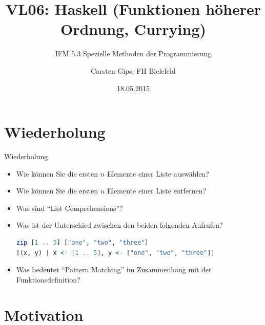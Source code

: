 \documentclass[svgnames,smaller,ngerman]{beamer}
\title{VL06: Haskell (Funktionen höherer Ordnung, Currying)}
\subtitle{IFM 5.3 Spezielle Methoden der Programmierung}
\author{Carsten Gips, FH Bielefeld}
\date{18.05.2015}
\begin{document}
\frame{
    \titlepage
}



\section{Wiederholung}

\begin{frame}[fragile]{Wiederholung}
    \begin{itemize}
        \item Wie können Sie die ersten $n$ Elemente einer Liste auswählen?
        \item Wie können Sie die ersten $n$ Elemente einer Liste entfernen?
        \item Was sind \enquote{List Comprehensions}?
        \item Was ist der Unterschied zwischen den beiden folgenden Aufrufen?
        \begin{small}
        \begin{lstlisting}[language=Haskell]
zip [1 .. 5] ["one", "two", "three"]
[(x, y) | x <- [1 .. 5], y <- ["one", "two", "three"]]
        \end{lstlisting}
        \end{small}
        \item Was bedeutet \enquote{Pattern Matching} im Zusammenhang mit der
        Funktionsdefinition?
    \end{itemize}
\end{frame}



\section{Motivation}
\end{document}
